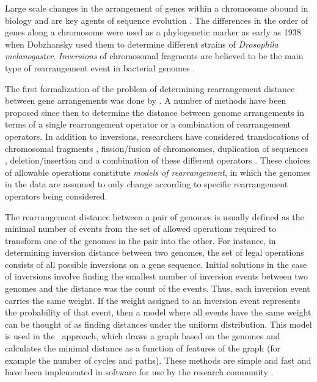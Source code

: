 \documentclass[utf8]{Frontiers_LaTex_Templates/frontiersFPHY} %
\numberwithin{equation}{section}
\begin{document}
Large scale changes in the arrangement of genes within a chromosome abound in biology and are key agents of sequence evolution \citep{beckmann2007copy,belda2005genome}. The differences in the order of genes along a chromosome were used as a phylogenetic marker as early as 1938~\citep{dobzhansky1938inversions} when Dobzhansky used them to determine different strains of \emph{Drosophila melanogaster}. \emph{Inversions} of chromosomal fragments are believed to be the main type of rearrangement event in bacterial genomes \citep{belda2005genome}.  

The first formalization of the problem of determining rearrangement distance between gene arrangements was done by \citet{watterson1982chromosome}. A number of methods have been proposed since then to determine the distance between genome arrangements in terms of a single rearrangement operator or a combination of rearrangement operators. In addition to inversions, researchers have considered translocations of chromosomal fragments \citep{bafna1995sorting,bafna1998sorting,yin2013sorting}, fission/fusion of chromosomes, duplication of sequences \citep{chaudhuri2006tandem}, deletion/insertion and a combination of these different operators \citep{yancopoulos2005efficient}. These choices of allowable operations constitute \emph{models of rearrangement}, in which the genomes in the data are assumed to only change according to specific rearrangement operators being considered.

The rearrangement distance between a pair of genomes is usually defined as the minimal number of events from the set of allowed operations required to transform one of the genomes in the pair into the other. For instance, in determining inversion distance between two genomes, the set of legal operations consists of all possible inversions on a gene sequence.  Initial solutions in the case of inversions involve finding the smallest number of inversion events between two genomes and the distance was the count of the events. Thus, each inversion event carries the same weight. If the weight assigned to an inversion event represents the probability of that event, then a model where all events have the same weight can be thought of as finding distances under the uniform distribution.  This model is used in the~\citet{hannenhalli1999transforming} approach, which draws a graph based on the genomes and calculates the minimal distance as a function of features of the graph (for example the number of cycles and paths). 
% 
These methods are simple and fast and have been implemented in software for use by the research community \citep{sankoff1991derange,tesler2002grimm,shao2014exact}. 
\end{document}
